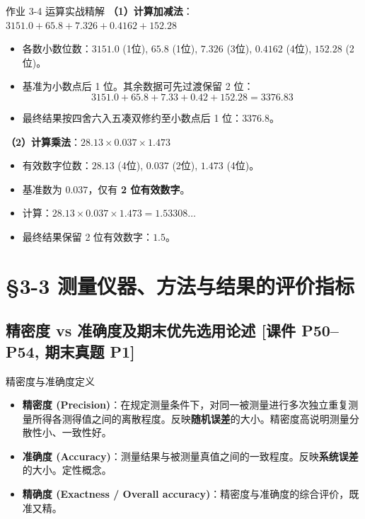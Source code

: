 \documentclass[11pt,a4paper]{ctexart}
\begin{document}
\begin{solbox}{作业 3-4 运算实战精解}
\textbf{（1）计算加减法}：$3151.0 + 65.8 + 7.326 + 0.4162 + 152.28$
\begin{itemize}
    \item 各数小数位数：$3151.0$ (1位), $65.8$ (1位), $7.326$ (3位), $0.4162$ (4位), $152.28$ (2位)。
    \item 基准为小数点后 1 位。其余数据可先过渡保留 2 位：
    $$3151.0 + 65.8 + 7.33 + 0.42 + 152.28 = 3376.83$$
    \item 最终结果按四舍六入五凑双修约至小数点后 1 位：$\mathbf{3376.8}$。
\end{itemize}

\textbf{（2）计算乘法}：$28.13 \times 0.037 \times 1.473$
\begin{itemize}
    \item 有效数字位数：$28.13$ (4位), $0.037$ (2位), $1.473$ (4位)。
    \item 基准数为 $0.037$，仅有 \textbf{2 位有效数字}。
    \item 计算：$28.13 \times 0.037 \times 1.473 = 1.53308\dots$
    \item 最终结果保留 2 位有效数字：$\mathbf{1.5}$。
\end{itemize}
\end{solbox}

\section{§3-3 测量仪器、方法与结果的评价指标}

\subsection{精密度 vs 准确度及期末优先选用论述 \textnormal{[课件 P50--P54, 期末真题 P1]}}

\begin{defbox}{精密度与准确度定义}
\begin{itemize}
    \item \textbf{精密度 (Precision)}：在规定测量条件下，对同一被测量进行多次独立重复测量所得各测得值之间的离散程度。反映\textbf{随机误差}的大小。精密度高说明测量分散性小、一致性好。
    \item \textbf{准确度 (Accuracy)}：测量结果与被测量真值之间的一致程度。反映\textbf{系统误差}的大小。定性概念。
    \item \textbf{精确度 (Exactness / Overall accuracy)}：精密度与准确度的综合评价，既准又精。
\end{itemize}
\end{defbox}
\end{document}

